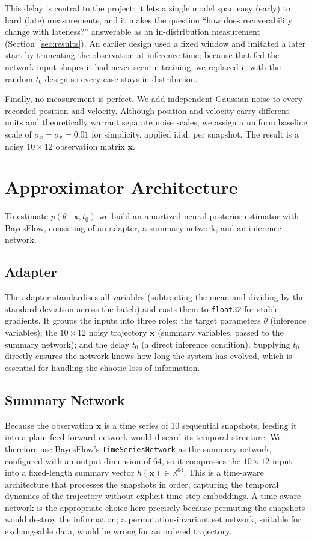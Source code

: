 \documentclass[12pt]{article}
\begin{document}
This delay is central to the project: it lets a single model span easy (early) to hard
(late) measurements, and it makes the question ``how does recoverability change with
lateness?'' answerable as an in-distribution measurement (Section~\ref{sec:results}). An
earlier design used a fixed window and imitated a later start by truncating the observation
at inference time; because that fed the network input shapes it had never seen in training,
we replaced it with the random-$t_0$ design so every case stays in-distribution.
 
Finally, no measurement is perfect. We add independent Gaussian noise to every recorded
position and velocity. Although position and velocity carry different units and theoretically warrant separate noise scales, we assign a uniform baseline scale of $\sigma_x = \sigma_v = 0.01$ for simplicity, applied i.i.d. per snapshot. The result is a noisy $10 \times 12$ observation matrix $\mathbf{x}$.
 
\section{Approximator Architecture}
To estimate $p(\theta \mid \mathbf{x}, t_0)$ we build an amortized neural posterior estimator
with BayesFlow, consisting of an adapter, a summary network, and an inference network.
 
\subsection{Adapter}
The adapter standardises all variables (subtracting the mean and dividing by the standard
deviation across the batch) and casts them to \texttt{float32} for stable gradients. It groups
the inputs into three roles: the target parameters $\theta$ (inference variables); the
$10\times12$ noisy trajectory $\mathbf{x}$ (summary variables, passed to the summary network);
and the delay $t_0$ (a direct inference condition). Supplying $t_0$ directly ensures the network
knows how long the system has evolved, which is essential for handling the chaotic loss of
information.
 
\subsection{Summary Network}
Because the observation $\mathbf{x}$ is a time series of 10 sequential snapshots, feeding it into
a plain feed-forward network would discard its temporal structure. We therefore use BayesFlow's
\texttt{TimeSeriesNetwork} as the summary network, configured with an output dimension of 64, so
it compresses the $10\times12$ input into a fixed-length summary vector
$h(\mathbf{x}) \in \mathbb{R}^{64}$. This is a time-aware architecture that processes the
snapshots in order, capturing the temporal dynamics of the trajectory without explicit time-step
embeddings. A time-aware network is the appropriate choice here precisely because permuting the
snapshots would destroy the information; a permutation-invariant set network, suitable for
exchangeable data, would be wrong for an ordered trajectory.
 
\end{document}
